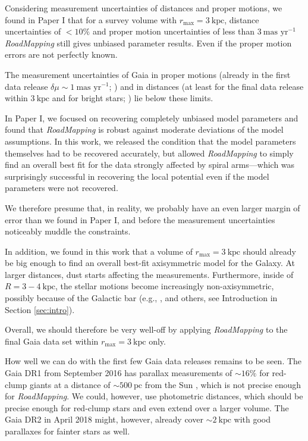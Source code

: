 \documentclass[iop,revtex4,numberedappendix,appendixfloats]{emulateapj}
\newcommand{\RM}{{\sl RoadMapping}}
\begin{document}
Considering measurement uncertainties of distances and proper motions, we found in Paper I that for a survey volume with $r_\text{max} = 3~\text{kpc}$, distance uncertainties of $<10\%$ and proper motion uncertainties of less than $3~\text{mas yr}^{-1}$ \RM{} still gives unbiased parameter results. Even if the proper motion errors are not perfectly known. 

The measurement uncertainties of Gaia in proper motions (already in the first data release $\delta \mu \sim 1~\text{mas yr}^{-1}$; \citealt{2016A&A...595A...4L}) and in distances (at least for the final data release within $3~\text{kpc}$ and for bright stars; \citealt{2014EAS....67...23D}) lie below these limits. 

In Paper I, we focused on recovering completely unbiased model parameters and found that \RM{} is robust against moderate deviations of the model assumptions. In this work, we released the condition that the model parameters themselves had to be recovered accurately, but allowed \RM{} to simply find an overall best fit for the data strongly affected by spiral arms---which was surprisingly successful in recovering the local potential even if the model parameters were not recovered. 

We therefore presume that, in reality, we probably have an even larger margin of error than we found in Paper I, and before the measurement uncertainties noticeably muddle the constraints.

In addition, we found in this work that a volume of $r_\text{max} = 3~\text{kpc}$ should already be big enough to find an overall best-fit axisymmetric model for the Galaxy. At larger distances, dust starts affecting the measurements. Furthermore, inside of $R=3-4~\text{kpc}$, the stellar motions become increasingly non-axisymmetric, possibly because of the Galactic bar (e.g., \citealt{2014ApJ...783..130R,2015ApJ...800...83B}, and others, see Introduction in Section \ref{sec:intro}).

Overall, we should therefore be very well-off by applying \RM{} to the final Gaia data set within $r_\text{max}=3~\text{kpc}$ only.

How well we can do with the first few Gaia data releases remains to be seen. The Gaia DR1 from September 2016 has parallax measurements of $\sim16\%$ for red-clump giants at a distance of $\sim 500~\text{pc}$ from the Sun \citep{2014EAS....67...23D,2015A&A...574A.115M}, which is not precise enough for \RM{}. We could, however, use photometric distances, which should be precise enough for red-clump stars and even extend over a larger volume. The Gaia DR2 in April 2018 might, however, already cover $\sim 2~\text{kpc}$ with good parallaxes for fainter stars as well.
\end{document}
